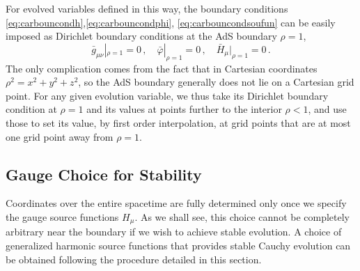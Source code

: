 \documentclass[a4paper,11pt]{article}
\numberwithin{equation}{section}
\begin{document}
For evolved variables defined in this way, the boundary conditions \eqref{eq:carbouncondh},\eqref{eq:carbouncondphi}, \eqref{eq:carbouncondsoufun} can be easily imposed as  Dirichlet boundary conditions at the AdS boundary $\rho=1$,
\begin{equation}
 \bar{g}_{\mu\nu}|_{\rho=1}=0\,,\quad \bar{\varphi}|_{\rho=1}=0\,,\quad \bar{H}_\mu|_{\rho=1}=0\,.
 \end{equation}
The only complication comes from the fact that in Cartesian coordinates $\rho^2=x^2+y^2+z^2$, so the AdS boundary generally does not lie on a Cartesian grid point. 
For any given evolution variable, we thus take its Dirichlet boundary condition at $\rho=1$ and its values at points further to the interior $\rho<1$, and use those to set its value, by first order interpolation, at grid points that are at most one grid point away from $\rho=1$.


\subsection{Gauge Choice for Stability}\label{sec:gauge_choice}

Coordinates over the entire spacetime are fully determined only once we specify the gauge source functions $H_\mu$. As we shall see, this choice cannot be completely arbitrary near the boundary if we wish to achieve stable evolution. A choice of generalized harmonic source functions that provides stable Cauchy evolution can be obtained following the procedure detailed in this section.
\end{document}
